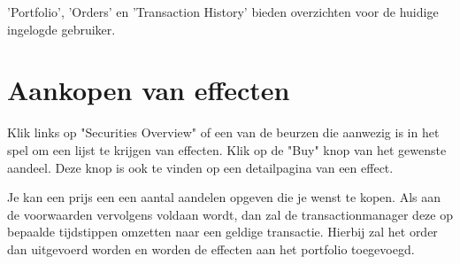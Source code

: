 'Portfolio', 'Orders' en 'Transaction History' bieden overzichten voor de huidige ingelogde gebruiker.

\section{Aankopen van effecten}

Klik links op "Securities Overview" of een van de beurzen die aanwezig is in het spel om een lijst te krijgen van effecten. Klik op de "Buy" knop van het gewenste aandeel. Deze knop is ook te vinden op een detailpagina van een effect.

Je kan een prijs een een aantal aandelen opgeven die je wenst te kopen. Als aan de voorwaarden vervolgens voldaan wordt, dan zal de transactionmanager deze op bepaalde tijdstippen omzetten naar een geldige transactie. Hierbij zal het order dan uitgevoerd worden en worden de effecten aan het portfolio toegevoegd.